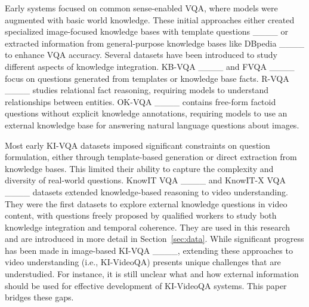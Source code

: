 Early systems focused on common sense-enabled VQA, where models were augmented with basic world knowledge. These initial approaches either created specialized image-focused knowledge bases with template questions ____ or extracted information from general-purpose knowledge bases like DBpedia ____ to enhance VQA accuracy.
Several datasets have been introduced to study different aspects of knowledge integration.  KB-VQA ____ and FVQA ____ focus on questions generated from templates or knowledge base facts. R-VQA ____ studies relational fact reasoning, requiring models to understand relationships between entities. OK-VQA ____ contains free-form factoid questions without explicit knowledge annotations, requiring models to use an external knowledge base for answering natural language questions about images.

Most early KI-VQA datasets imposed significant constraints on question formulation, either through template-based generation or direct extraction from knowledge bases. This limited their ability to capture the complexity and diversity of real-world questions. KnowIT VQA ____ and KnowIT-X VQA ____ datasets extended knowledge-based reasoning to video understanding. They were the first datasets to explore external knowledge questions in video content, with questions freely proposed by qualified workers to study both knowledge integration and temporal coherence. They are used in this research and are introduced in more detail in Section~\ref{sec:data}. While significant progress has been made in image-based KI-VQA ____, extending these approaches to video understanding (i.e., KI-VideoQA) presents unique challenges that are understudied. For instance, it is still unclear what and how external information should be used for effective development of KI-VideoQA systems. This paper bridges these gaps.